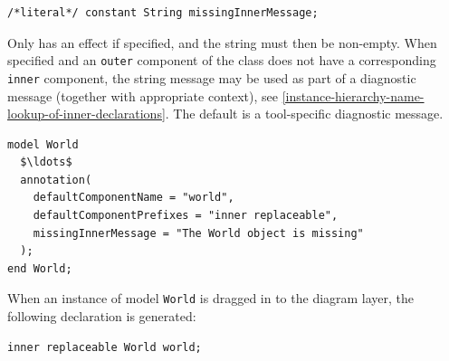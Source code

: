 \begin{annotationdefinition}[missingInnerMessage]
\begin{synopsis}\begin{lstlisting}
/*literal*/ constant String missingInnerMessage;
\end{lstlisting}\end{synopsis}
\begin{semantics}
Only has an effect if specified, and the string must then be non-empty.
When specified and an \lstinline!outer! component of the class does not have a corresponding \lstinline!inner! component, the string message may be used as part of a diagnostic message (together with appropriate context), see \cref{instance-hierarchy-name-lookup-of-inner-declarations}.
The default is a tool-specific diagnostic message.

\begin{example}
\begin{lstlisting}[language=modelica]
model World
  $\ldots$
  annotation(
    defaultComponentName = "world",
    defaultComponentPrefixes = "inner replaceable",
    missingInnerMessage = "The World object is missing"
  );
end World;
\end{lstlisting}
When an instance of model \lstinline!World! is dragged in to the diagram layer, the following declaration is generated:
\begin{lstlisting}[language=modelica]
inner replaceable World world;
\end{lstlisting}
\end{example}
\end{semantics}
\end{annotationdefinition}


